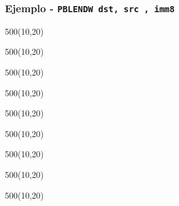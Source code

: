\documentclass[aspectratio=169]{beamer}
\begin{document}
\begin{frame}[fragile,t]
	\frametitle{Ejemplo - \texttt{PBLENDW dst, src , imm8}}
	\begin{textblock}{500}(10,20)  \end{textblock} %
	\begin{textblock}{500}(10,20)  \end{textblock} %
	\begin{textblock}{500}(10,20)  \end{textblock} %
	\begin{textblock}{500}(10,20)  \end{textblock} %
	\begin{textblock}{500}(10,20)  \end{textblock} %
	\begin{textblock}{500}(10,20)  \end{textblock} %
	\begin{textblock}{500}(10,20)  \end{textblock} %
	\begin{textblock}{500}(10,20)  \end{textblock} %
	\begin{textblock}{500}(10,20)  \end{textblock} %
\end{frame}
\end{document}
